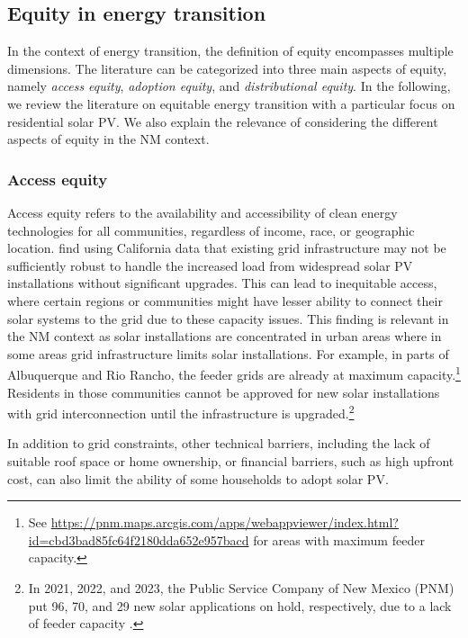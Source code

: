 \documentclass[11pt,twoside,letterpaper]{article}
\begin{document}
\subsection{Equity in energy transition}
\label{section:equity}

In the context of energy transition, the definition of equity encompasses multiple dimensions. The literature can be categorized into three main aspects of equity, namely \textit{access equity}, \textit{adoption equity}, and \textit{distributional equity}. In the following, we review the literature on equitable energy transition with a particular focus on residential solar PV. We also explain the relevance of considering the different aspects of equity in the NM context.

\subsubsection{Access equity}

 Access equity refers to the availability and accessibility of clean energy technologies for all communities, regardless of income, race, or geographic location. \textcite{brockway_inequitable_2021} find using California data that existing grid infrastructure may not be sufficiently robust to handle the increased load from widespread solar PV installations without significant upgrades. This can lead to inequitable access, where certain regions or communities might have lesser ability to connect their solar systems to the grid due to these capacity issues. This finding is relevant in the NM context as solar installations are concentrated in urban areas where in some areas grid infrastructure limits solar installations. For example, in parts of Albuquerque and Rio Rancho, the feeder grids are already at maximum capacity.\footnote{See \url{https://pnm.maps.arcgis.com/apps/webappviewer/index.html?id=cbd3bad85fc64f2180dda652e957bacd} for areas with maximum feeder capacity.} Residents in those communities cannot be approved for new solar installations with grid interconnection until the infrastructure is upgraded.\footnote{In 2021, 2022, and 2023, the Public Service Company of New Mexico (PNM) put 96, 70, and 29 new solar applications on hold, respectively, due to a lack of feeder capacity \parencite{pnm2021,pnm2022,pnm2023}. }

 In addition to grid constraints, other technical barriers, including the lack of suitable roof space or home ownership, or financial barriers, such as high upfront cost, can also limit the ability of some households to adopt solar PV.
 
\end{document}
